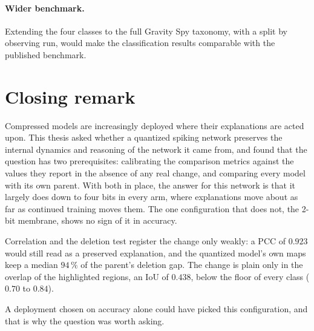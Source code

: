 \paragraph{Wider benchmark.} Extending the four classes to the full Gravity Spy
taxonomy, with a split by observing run, would make the classification results
comparable with the published benchmark.

\section{Closing remark}

Compressed models are increasingly deployed where their explanations are acted
upon. This thesis asked whether a quantized spiking network preserves the
internal dynamics and reasoning of the network it came from, and found that the
question has two prerequisites: calibrating the comparison metrics against the
values they report in the absence of any real change, and comparing every model
with its own parent. With both in place, the answer for this network is that it
largely does down to four bits in every arm, where explanations move about as
far as continued training moves them. The one configuration that does not, the
2-bit membrane, shows no sign of it in accuracy.

Correlation and the deletion test register the change only weakly: a PCC of
$0.923$ would still read as a preserved explanation, and the quantized model's
own maps keep a median $94\,\%$ of the parent's deletion gap. The change is plain
only in the overlap of the highlighted regions, an IoU of $0.438$, below the
floor of every class ($0.70$ to $0.84$).

A deployment chosen on accuracy alone could have picked this configuration, and
that is why the question was worth asking.